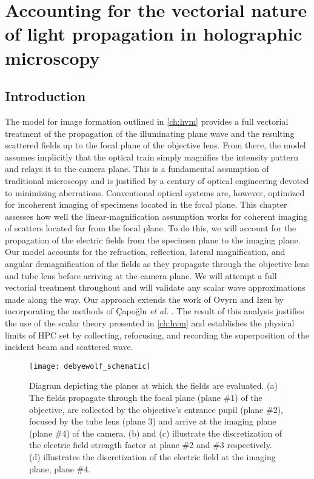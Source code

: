 \chapter{Accounting for the vectorial nature of light propagation in holographic microscopy}
\label{ch:debye}

\section{Introduction}

The model for image formation outlined in \autoref{ch:hvm} provides a full
vectorial treatment of the propagation of the illuminating plane wave and
the resulting scattered fields up to the focal plane of the objective lens.
From there, the model assumes implicitly that the optical train
simply magnifies the intensity pattern and relays it to the camera plane.
This is a fundamental assumption of traditional microscopy and is justified
by a century of optical engineering devoted to minimizing aberrations.
Conventional optical systems are, however, optimized for incoherent imaging of
specimens located in the focal plane.
This chapter assesses how well the linear-magnification assumption works for
coherent imaging of scatters located far from the focal plane. To do this, we will
account for the propagation of the electric fields from
the specimen plane to the imaging plane. Our model accounts for the
refraction, reflection, lateral magnification, and angular demagnification
of the fields as they propagate through the objective lens and tube lens
before arriving at the camera plane. We will attempt a full vectorial
treatment throughout and will validate any scalar wave approximations
made along the way. Our approach extends the work of
Ovyrn and Izen\cite{izen00} by incorporating the methods of \c{C}apo\u{g}lu \emph{et al.}
\cite{capoglu12}. 
The result of this analysis justifies the use of the scalar theory presented in \autoref{ch:hvm} and
establishes the physical limits of HPC set by collecting, refocusing, and recording
the superposition of the incident beam and scattered wave.

\begin{figure}
  \centering
  \texttt{[image: debyewolf\_schematic]}
  \caption{Diagram depicting the planes at which the fields are evaluated.
    (a) The fields propagate through the focal plane (plane \#1) of the objective,
    are collected by the objective's entrance pupil (plane \#2), focused by the tube lens (plane 3)
    and arrive at the imaging plane (plane \#4) of the camera. (b) and (c) illustrate the
    discretization of the electric field strength factor at plane \#2 and \#3 respectively.
    (d) illustrates the discretization of the electric field at the imaging plane, plane \#4.}
  \label{fig:debye_schematic}
\end{figure}

